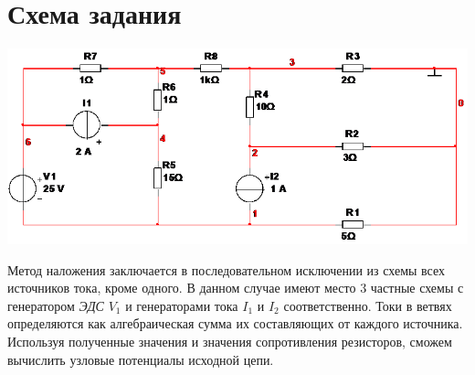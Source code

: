 \documentclass[12pt, a4paper]{report}
\begin{document}
    \section{\textbf{Схема задания}}
    \begin{center}
        \includegraphics[scale = 0.9]{photo1.png}
    \end{center}\bigskip\bigskip\par
    Метод наложения заключается в последовательном исключении из схемы всех
    источников тока, кроме одного. В данном случае имеют место 3 частные схемы с
    генератором \textit{ЭДС} $V_1$ и генераторами тока $I_1$ и $I_2$ соответственно. Токи в ветвях
    определяются как алгебраическая сумма их составляющих от каждого источника.
    Используя полученные значения и значения сопротивления резисторов, сможем
    вычислить узловые потенциалы исходной цепи.

    \newpage
\end{document}
